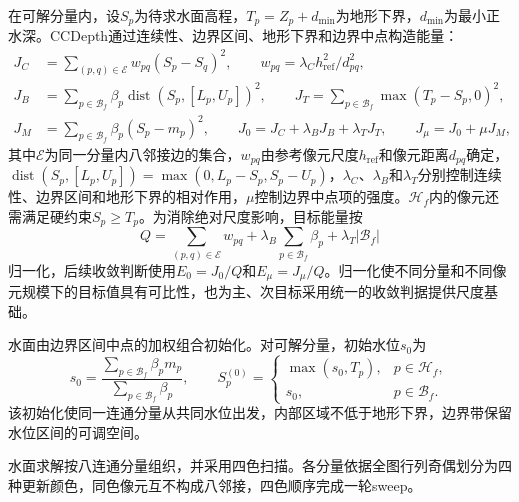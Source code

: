 \documentclass[authoryear,preprint,12pt]{elsarticle}
\begin{document}
在可解分量内，设\(S_p\)为待求水面高程，\(T_p=Z_p+d_{\min}\)为地形下界，\(d_{\min}\)为最小正水深。CCDepth通过连续性、边界区间、地形下界和边界中点构造能量：
\begin{equation}\label{eq:ccdepth_energy}
 \begin{aligned}
 J_C&=\sum_{(p,q)\in\mathcal E}w_{pq}(S_p-S_q)^2,\qquad w_{pq}=\lambda_C h_{\mathrm{ref}}^2/d_{pq}^2,\\
 J_B&=\sum_{p\in\mathcal B_f}\beta_p\operatorname{dist}(S_p,[L_p,U_p])^2,\qquad
 J_T=\sum_{p\in\mathcal B_f}\max(T_p-S_p,0)^2,\\
 J_M&=\sum_{p\in\mathcal B_f}\beta_p(S_p-m_p)^2,\qquad
 J_0=J_C+\lambda_B J_B+\lambda_T J_T,\qquad J_\mu=J_0+\mu J_M,
 \end{aligned}
\end{equation}
其中\(\mathcal E\)为同一分量内八邻接边的集合，\(w_{pq}\)由参考像元尺度\(h_{\mathrm{ref}}\)和像元距离\(d_{pq}\)确定，\(\operatorname{dist}(S_p,[L_p,U_p])=\max(0,L_p-S_p,S_p-U_p)\)，\(\lambda_C\)、\(\lambda_B\)和\(\lambda_T\)分别控制连续性、边界区间和地形下界的相对作用，\(\mu\)控制边界中点项的强度。\(\mathcal H_f\)内的像元还需满足硬约束\(S_p\geq T_p\)。为消除绝对尺度影响，目标能量按
\begin{equation}\label{eq:ccdepth_normalized_energy}
 Q=\sum_{(p,q)\in\mathcal E}w_{pq}+\lambda_B\sum_{p\in\mathcal B_f}\beta_p+\lambda_T|\mathcal B_f|
\end{equation}
归一化，后续收敛判断使用\(E_0=J_0/Q\)和\(E_\mu=J_\mu/Q\)。归一化使不同分量和不同像元规模下的目标值具有可比性，也为主、次目标采用统一的收敛判据提供尺度基础。

水面由边界区间中点的加权组合初始化。对可解分量，初始水位\(s_0\)为
\begin{equation}\label{eq:ccdepth_initialization}
 s_0=\frac{\sum_{p\in\mathcal B_f}\beta_p m_p}{\sum_{p\in\mathcal B_f}\beta_p},\qquad
 S_p^{(0)}=
 \begin{cases}
  \max(s_0,T_p), & p\in\mathcal H_f,\\
  s_0, & p\in\mathcal B_f.
 \end{cases}
\end{equation}
该初始化使同一连通分量从共同水位出发，内部区域不低于地形下界，边界带保留水位区间的可调空间。

水面求解按八连通分量组织，并采用四色扫描。各分量依据全图行列奇偶划分为四种更新颜色，同色像元互不构成八邻接，四色顺序完成一轮sweep。
\end{document}

